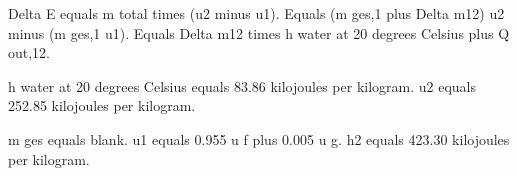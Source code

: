 Delta E equals m total times (u2 minus u1).  
Equals (m ges,1 plus Delta m12) u2 minus (m ges,1 u1).  
Equals Delta m12 times h water at 20 degrees Celsius plus Q out,12.  

h water at 20 degrees Celsius equals 83.86 kilojoules per kilogram.  
u2 equals 252.85 kilojoules per kilogram.  

m ges equals blank.  
u1 equals 0.955 u f plus 0.005 u g.  
h2 equals 423.30 kilojoules per kilogram.